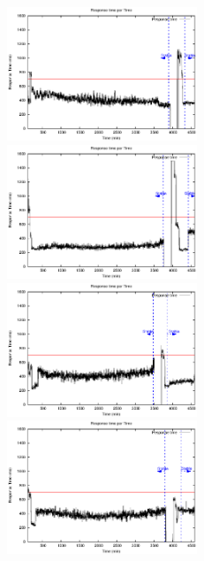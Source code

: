 \begin{figure}[htb]
	\begin{minipage}[b]{0.19\linewidth}
		\includegraphics[width=\linewidth,height=4cm]{images/exps2011/low/das/proxyDataPoints_output.eps}	
	\end{minipage}
\begin{minipage}[b]{0.19\linewidth}
		\includegraphics[width=\linewidth,height=4cm]{images/exps2011/medium_down/das/proxyDataPoints_output.eps}
	\end{minipage}
	\begin{minipage}[b]{0.19\linewidth}
		\includegraphics[width=\linewidth,height=4cm]{images/exps2011/medium/das/proxyDataPoints_output.eps}
	\end{minipage}
\begin{minipage}[b]{0.19\linewidth}
		\includegraphics[width=\linewidth,height=4cm]{images/exps2011/medium_up/das/proxyDataPoints_output.eps}

\end{minipage}
\end{figure}
